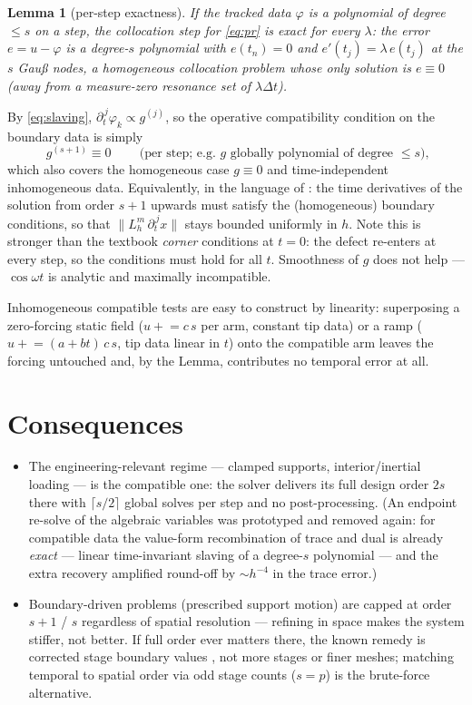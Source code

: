\documentclass[11pt,a4paper]{article}
\newtheorem{lemma}{Lemma}
\newcommand{\dt}{\Delta t}
\begin{document}
\begin{lemma}[per-step exactness]
If the tracked data $\varphi$ is a polynomial of degree $\le s$ on a step, the
collocation step for \eqref{eq:pr} is exact for every $\lambda$: the error
$e = u - \varphi$ is a degree-$s$ polynomial with $e(t_n) = 0$ and
$e'(t_j) = \lambda\, e(t_j)$ at the $s$ Gau{\ss} nodes, a homogeneous collocation
problem whose only solution is $e \equiv 0$ (away from a measure-zero resonance
set of $\lambda\dt$).
\end{lemma}

By \eqref{eq:slaving}, $\partial_t^{\,j}\varphi_k \propto g^{(j)}$, so the
operative compatibility condition on the boundary data is simply
\begin{equation*}
  \boxed{\ g^{(s+1)} \equiv 0 \ }
  \qquad\text{(per step; e.g.\ $g$ globally polynomial of degree $\le s$),}
\end{equation*}
which also covers the homogeneous case $g \equiv 0$ and time-independent
inhomogeneous data. Equivalently, in the language of \cite{ssvh,or}: the time
derivatives of the solution from order $s{+}1$ upwards must satisfy the
(homogeneous) boundary conditions, so that $\|L_h^m\, \partial_t^{\,j} x\|$
stays bounded uniformly in $h$. Note this is stronger than the textbook
\emph{corner} conditions at $t = 0$: the defect re-enters at every step, so the
conditions must hold for all $t$. Smoothness of $g$ does not help --- $\cos
\omega t$ is analytic and maximally incompatible.

Inhomogeneous compatible tests are easy to construct by linearity: superposing a
zero-forcing static field ($u \mathrel{+}= c\,s$ per arm, constant tip data) or
a ramp ($u \mathrel{+}= (a + bt)\,c\,s$, tip data linear in $t$) onto the
compatible arm leaves the forcing untouched and, by the Lemma, contributes no
temporal error at all.

\section{Consequences}

\begin{itemize}
\item The engineering-relevant regime --- clamped supports, interior/inertial
  loading --- is the compatible one: the solver delivers its full design order
  $2s$ there with $\lceil s/2\rceil$ global solves per step and no
  post-processing. (An endpoint re-solve of the algebraic variables was
  prototyped and removed again: for compatible data the value-form recombination
  of trace and dual is already \emph{exact} --- linear time-invariant slaving of
  a degree-$s$ polynomial --- and the extra recovery amplified round-off by
  $\sim h^{-4}$ in the trace error.)
\item Boundary-driven problems (prescribed support motion) are capped at order
  $s{+}1$ / $s$ regardless of spatial resolution --- refining in space makes the
  system stiffer, not better. If full order ever matters there, the known remedy
  is corrected stage boundary values \cite{amp,cgad}, not more stages or finer
  meshes; matching temporal to spatial order via odd stage counts ($s = p$) is
  the brute-force alternative.
\end{itemize}
\end{document}
